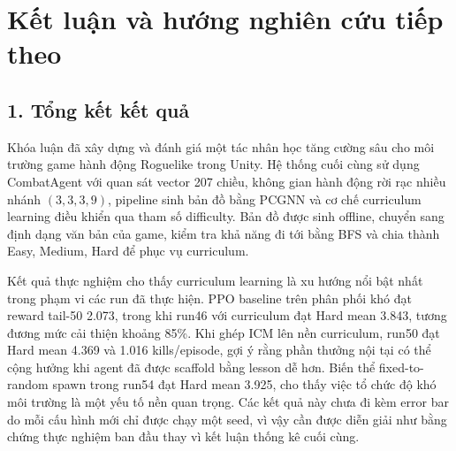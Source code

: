 \clearpage
{}


\chapter*{Kết luận và hướng nghiên cứu tiếp theo}

\section*{1. Tổng kết kết quả}

Khóa luận đã xây dựng và đánh giá một tác nhân học tăng cường sâu cho môi trường game hành động Roguelike trong Unity. Hệ thống cuối cùng sử dụng CombatAgent với quan sát vector 207 chiều, không gian hành động rời rạc nhiều nhánh $(3,3,3,9)$, pipeline sinh bản đồ bằng PCGNN và cơ chế curriculum learning điều khiển qua tham số difficulty. Bản đồ được sinh offline, chuyển sang định dạng văn bản của game, kiểm tra khả năng đi tới bằng BFS và chia thành Easy, Medium, Hard để phục vụ curriculum.

Kết quả thực nghiệm cho thấy curriculum learning là xu hướng nổi bật nhất trong phạm vi các run đã thực hiện. PPO baseline trên phân phối khó đạt reward tail-50 2.073, trong khi run46 với curriculum đạt Hard mean 3.843, tương đương mức cải thiện khoảng 85\%. Khi ghép ICM lên nền curriculum, run50 đạt Hard mean 4.369 và 1.016 kills/episode, gợi ý rằng phần thưởng nội tại có thể cộng hưởng khi agent đã được scaffold bằng lesson dễ hơn. Biến thể fixed-to-random spawn trong run54 đạt Hard mean 3.925, cho thấy việc tổ chức độ khó môi trường là một yếu tố nền quan trọng. Các kết quả này chưa đi kèm error bar do mỗi cấu hình mới chỉ được chạy một seed, vì vậy cần được diễn giải như bằng chứng thực nghiệm ban đầu thay vì kết luận thống kê cuối cùng.

